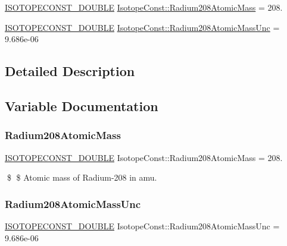 \begin{DoxyCompactItemize}
\item 
\mbox{\hyperlink{group___isotope_const-_macros_ga8f45a7272ce02c0b4c65c44636ed719a}{I\+S\+O\+T\+O\+P\+E\+C\+O\+N\+S\+T\+\_\+\+D\+O\+U\+B\+LE}} \mbox{\hyperlink{group___isotope_const-_radium-_ra208_ga6d4a547989fa7daeb1ddfc8dad8b11a9}{Isotope\+Const\+::\+Radium208\+Atomic\+Mass}} = 208.
\item 
\mbox{\hyperlink{group___isotope_const-_macros_ga8f45a7272ce02c0b4c65c44636ed719a}{I\+S\+O\+T\+O\+P\+E\+C\+O\+N\+S\+T\+\_\+\+D\+O\+U\+B\+LE}} \mbox{\hyperlink{group___isotope_const-_radium-_ra208_ga0f22efc03e1d57e0af8cc5eda71b83c5}{Isotope\+Const\+::\+Radium208\+Atomic\+Mass\+Unc}} = 9.\+686e-\/06
\end{DoxyCompactItemize}


\subsection{Detailed Description}


\subsection{Variable Documentation}
\mbox{\label{group___isotope_const-_radium-_ra208_ga6d4a547989fa7daeb1ddfc8dad8b11a9}} 
\subsubsection{\texorpdfstring{Radium208\+Atomic\+Mass}{Radium208AtomicMass}}
{\footnotesize\ttfamily \mbox{\hyperlink{group___isotope_const-_macros_ga8f45a7272ce02c0b4c65c44636ed719a}{I\+S\+O\+T\+O\+P\+E\+C\+O\+N\+S\+T\+\_\+\+D\+O\+U\+B\+LE}} Isotope\+Const\+::\+Radium208\+Atomic\+Mass = 208.}

\$ \$ Atomic mass of Radium-\/208 in amu. \mbox{\label{group___isotope_const-_radium-_ra208_ga0f22efc03e1d57e0af8cc5eda71b83c5}} 
\subsubsection{\texorpdfstring{Radium208\+Atomic\+Mass\+Unc}{Radium208AtomicMassUnc}}
{\footnotesize\ttfamily \mbox{\hyperlink{group___isotope_const-_macros_ga8f45a7272ce02c0b4c65c44636ed719a}{I\+S\+O\+T\+O\+P\+E\+C\+O\+N\+S\+T\+\_\+\+D\+O\+U\+B\+LE}} Isotope\+Const\+::\+Radium208\+Atomic\+Mass\+Unc = 9.\+686e-\/06}

